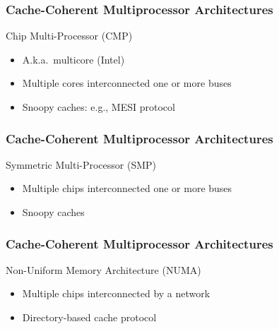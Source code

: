 \documentclass[xcolor=dvipsnames,9pt,mathserif]{beamer}
\newcommand{\pdftex}[2][1]{\scalebox{#1}{}}
\begin{document}
\begin{frame}
  \frametitle{Cache-Coherent Multiprocessor Architectures}

  \begin{block}{Chip Multi-Processor (CMP)}
    \begin{itemize}
    \item A.k.a.\ multicore (Intel)
    \item Multiple cores interconnected one or more buses
    \item Snoopy caches: e.g., MESI protocol
    \end{itemize}

    \centerline{\pdftex[.55]{threads_cmp}}
  \end{block}
\end{frame}

\begin{frame}
  \frametitle{Cache-Coherent Multiprocessor Architectures}

  \begin{block}{Symmetric Multi-Processor (SMP)}
    \begin{itemize}
    \item Multiple chips interconnected one or more buses
    \item Snoopy caches
    \end{itemize}

    \centerline{\pdftex[.55]{threads_smp}}
  \end{block}
\end{frame}

\begin{frame}
  \frametitle{Cache-Coherent Multiprocessor Architectures}

  \begin{block}{Non-Uniform Memory Architecture (NUMA)}
    \begin{itemize}
    \item Multiple chips interconnected by a network
    \item Directory-based cache protocol
    \end{itemize}

    \centerline{\pdftex[.55]{threads_numa}}
  \end{block}
\end{frame}
\end{document}
